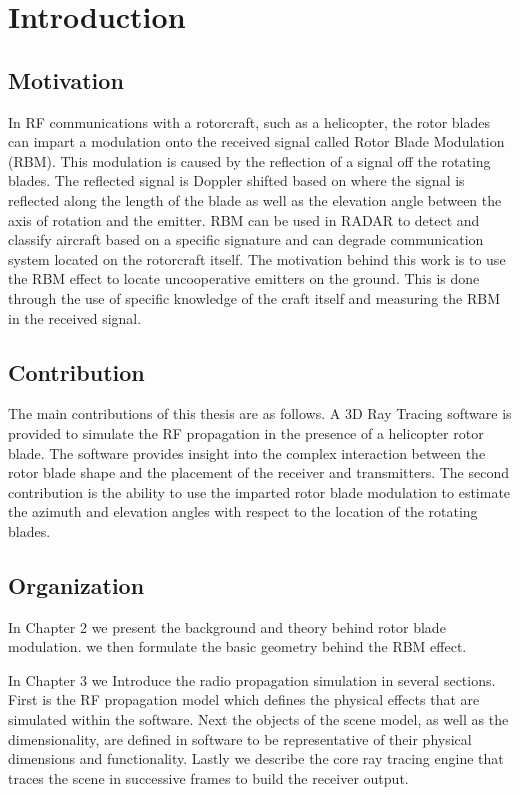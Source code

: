 \chapter{Introduction}

\section{Motivation}
In RF communications with a rotorcraft, such as a helicopter, the rotor blades can impart a modulation onto the received signal called Rotor Blade Modulation (RBM). This modulation is caused by the reflection of a signal off the rotating blades. The reflected signal is Doppler shifted based on where the signal is reflected along the length of the blade as well as the elevation angle between the axis of rotation and the emitter. RBM can be used in RADAR to detect and classify aircraft based on a specific signature and can degrade communication system located on the rotorcraft itself. The motivation behind this work is to use the RBM effect to locate uncooperative emitters on the ground. This is done through the use of specific knowledge of the craft itself and measuring the RBM in the received signal.

\section{Contribution}
The main contributions of this thesis are as follows. A 3D Ray Tracing software is provided to simulate the RF propagation in the presence of a helicopter rotor blade. The software provides insight into the complex interaction between the rotor blade shape and the placement of the receiver and transmitters. The second contribution is the ability to use the imparted rotor blade modulation to estimate the azimuth and elevation angles with respect to the location of the rotating blades.

\section{Organization}
In Chapter 2 we present the background and theory behind rotor blade modulation. we then formulate the basic geometry behind the RBM effect.

In Chapter 3 we Introduce the radio propagation simulation in several sections. First is the RF propagation model which defines the physical effects that are simulated within the software. Next the objects of the scene model, as well as the dimensionality, are defined in software to be representative of their physical  dimensions and functionality. Lastly we describe the core ray tracing engine that traces the scene in successive frames to build the receiver output.

